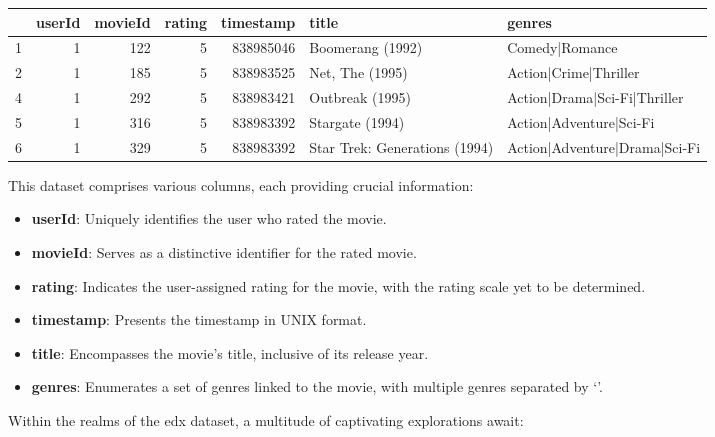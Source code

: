 \documentclass[
]{article}
\providecommand{\tightlist}{%
  \setlength{\itemsep}{0pt}\setlength{\parskip}{0pt}}
\begin{document}
\begin{table}[!h]
\centering\begingroup\fontsize{8}{10}\selectfont

\begin{tabular}{l|r|r|r|r|l|l}
\hline
  & userId & movieId & rating & timestamp & title & genres\\
\hline
1 & 1 & 122 & 5 & 838985046 & Boomerang (1992) & Comedy|Romance\\
\hline
2 & 1 & 185 & 5 & 838983525 & Net, The (1995) & Action|Crime|Thriller\\
\hline
4 & 1 & 292 & 5 & 838983421 & Outbreak (1995) & Action|Drama|Sci-Fi|Thriller\\
\hline
5 & 1 & 316 & 5 & 838983392 & Stargate (1994) & Action|Adventure|Sci-Fi\\
\hline
6 & 1 & 329 & 5 & 838983392 & Star Trek: Generations (1994) & Action|Adventure|Drama|Sci-Fi\\
\hline
\end{tabular}
\endgroup{}
\end{table}

This dataset comprises various columns, each providing crucial
information:

\begin{itemize}
\tightlist
\item
  \textbf{userId}: Uniquely identifies the user who rated the movie.
\item
  \textbf{movieId}: Serves as a distinctive identifier for the rated
  movie.
\item
  \textbf{rating}: Indicates the user-assigned rating for the movie,
  with the rating scale yet to be determined.
\item
  \textbf{timestamp}: Presents the timestamp in UNIX format.
\item
  \textbf{title}: Encompasses the movie's title, inclusive of its
  release year.
\item
  \textbf{genres}: Enumerates a set of genres linked to the movie, with
  multiple genres separated by `\textbar{}'.
\end{itemize}

Within the realms of the edx dataset, a multitude of captivating
explorations await:
\end{document}
